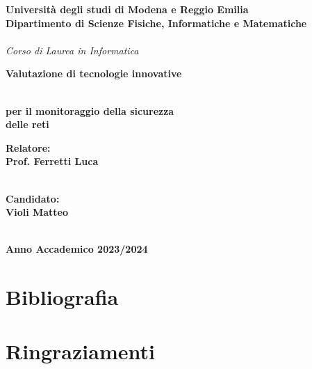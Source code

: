 \documentclass[12pt,a4paper,oneside,onecolumn,openright]{book}
\begin{document}
	\begin{titlepage}
		\begin{center}
			{
				\large
				\textbf{Università  degli studi di Modena e Reggio Emilia} \\
				\textbf{Dipartimento di Scienze Fisiche, Informatiche e Matematiche} \\
				\hspace*{0cm} \hrulefill \hspace*{0cm} \\
				\emph{Corso di Laurea in Informatica}
				
				
				
				\huge{\bf Valutazione di tecnologie innovative}}\\
			\vspace{3mm}
			{\huge{\bf per il monitoraggio della sicurezza }}\\
			\vspace{3mm}
			\vspace{3mm}
			{\huge{\bf delle reti}}\\
			\vspace{3mm}
			\vspace{3mm}
			
		\end{center}
		
		\vspace{40mm}
		\par
		\noindent
		\begin{minipage}[t]{0.47\textwidth}
			{\large{\bf Relatore:\\
					Prof.
					Ferretti Luca}}\\ 
			\\
		\end{minipage}
		\hfill
		\begin{minipage}[t]{0.47\textwidth}\raggedleft
			{\large{\bf Candidato:\\
					Violi Matteo}}
		\end{minipage}
		\vspace{20mm}
		\begin{center}
			\hspace*{0cm} \hrulefill \hspace*{0cm} \\
			{\large{\bf 
					Anno Accademico 2023/2024}}
		\end{center}
		
	\end{titlepage}
	
	\tableofcontents
	
	
	
	
	
	
	
	
	
	\chapter{Bibliografia}
	\printbibliography[heading=none]
	
	\chapter{Ringraziamenti}
	
\end{document}
